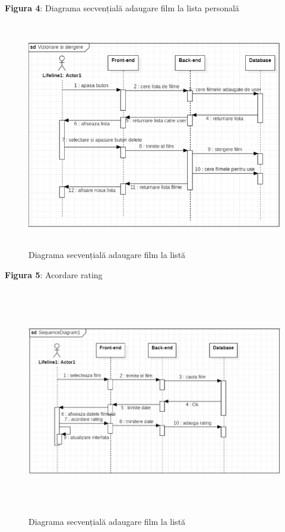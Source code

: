 \par \textbf{Figura 4}: Diagrama secvențială adaugare film la lista personală
		\begin{figure}[!h]
			\centerline{\includegraphics[width=14cm, height=10cm]{figures/fig.png}}
			\caption{Diagrama secvențială adaugare film la listă}
			\label{fig}
		\end{figure}

\par \textbf{Figura 5}: Acordare rating
		\begin{figure}[!h]
			\centerline{\includegraphics[width=14cm, height=10cm]{figures/acordare rating.png}}
			\caption{Diagrama secvențială adaugare film la listă}
			\label{fig}
		\end{figure}


